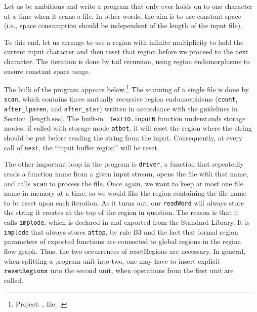\documentclass[12pt]{book}
\begin{document}
Let us be ambitious and write a program that only ever holds on to one character at a
time when it scans a file. In other words, the aim is to use constant space (i.e., space
consumption should be independent of the length of the input file).

To this end, let us arrange to use a region with infinite multiplicity to
hold the current input character and then reset that region before we proceed
to the next character. The iteration is done by tail recursion, using region
endomorphisms to ensure constant space usage.

The bulk of the program appears below.\footnote{Project:
  , file: .} The
scanning of a single file is done by {\tt scan}, which contains three
mutually recursive region endomorphisms ({\tt count}, {\tt
  after\_lparen}, and {\tt after\_star}) written in accordance with
the guidelines in Section~\ref{length.sec}. The built-in {\tt
  TextIO.inputN} function understands storage modes; if called with
storage mode {\tt atbot}, it will reset the region where the string
should be put before reading the string from the input.  Consequently,
at every call of {\tt next}, the ``input buffer region'' will be
reset.

The other important loop in the program is {\tt driver}, a function that
repeatedly reads a function name from a given input stream, opens the file
with that name, and calls {\tt scan} to process the file. Once again, we
want to keep at most one file name in memory at a time, so we would like
the region containing the file name to be reset upon each iteration.
As it turns out, our {\tt readWord} will always store the string it
creates at the top of the region in question. The reason is that
it calls {\tt implode}, which is declared in and exported from 
the Standard Library. It is {\tt implode} that always stores {\tt attop}, by
rule B3 and the fact that formal region parameters of exported functions
are connected to global regions in the region flow graph. 
Thus, the two occurrences of resetRegions are necessary. In general,
when splitting a program unit into two, one may have 
to insert explicit $\hbox{\tt resetRegions}$ into the second unit, when operations from the
first unit are called. 
\end{document}
